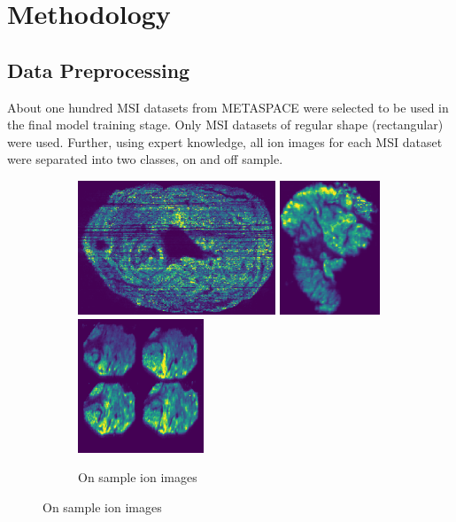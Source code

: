 \documentclass[a4paper]{article}
\begin{document}
    \section*{Methodology}
    
    \subsection*{Data Preprocessing}
    
    About one hundred MSI datasets from METASPACE were selected to be used in the final model training stage.
    Only MSI datasets of regular shape (rectangular) were used. Further, using expert knowledge,
    all ion images for each MSI dataset were separated into two classes, on and off sample.
    
    \begin{figure}[H]
        \begin{subfigure}[b]{\textwidth}
            \centering
            \includegraphics[width=\textwidth,height=4cm,keepaspectratio]{on_sample_1.png}
            \includegraphics[width=\textwidth,height=4cm,keepaspectratio]{on_sample_2.png}
            \includegraphics[width=\textwidth,height=4cm,keepaspectratio]{on_sample_3.png}
            \caption{On sample ion images}
        \end{subfigure}

\end{figure}
\end{document}
